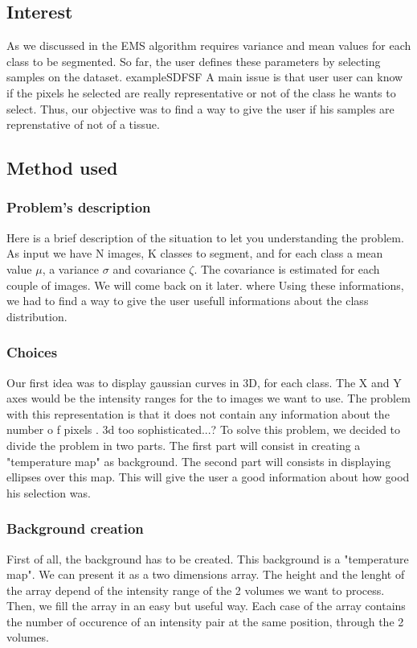 \subsection{Interest}
As we discussed in 
the EMS algorithm requires variance and mean values for each class to be segmented. So far, the user defines these parameters by selecting samples on the dataset.
%
exampleSDFSF
%
A main issue is that user user can know if the pixels he selected are really representative or not of the class he wants to select. Thus, our objective  was to find a way to give the user if his samples are reprenstative of not of a tissue.
\subsection{Method used}
\subsubsection{Problem's description}
Here is a brief description of the situation to let you understanding the problem. As input we have N images, K classes to segment, and for each class a mean value $\mu$, a variance $\sigma$ and covariance $\zeta$. The covariance is estimated for each couple of images. We will come back on it later.
%
where
%
Using these informations, we had to find a way to give the user usefull informations about the class distribution.
\subsubsection{Choices}
Our first idea was to display gaussian curves in 3D, for each class. The X and Y axes would be the intensity ranges for the to images we want to use.
The problem with this representation is that it does not contain any information about the number o
%
f pixels .  3d too sophisticated...?
%
To solve this problem, we decided to divide the problem in two parts.
The first part will consist in creating a "temperature map" as background.
The second part will consists in displaying ellipses over this map. This will give the user a good information about how good his selection was.
\subsubsection{Background creation}
First of all, the background has to be created. This background is a "temperature map".
We can present it as a two dimensions array. The height and the lenght of the array depend of the intensity range of the 2 volumes we want to process.
Then, we fill the array in an easy but useful way. Each 
%
case
%
of the array contains the number of occurence of an intensity pair at the same position, through the 2 volumes.

